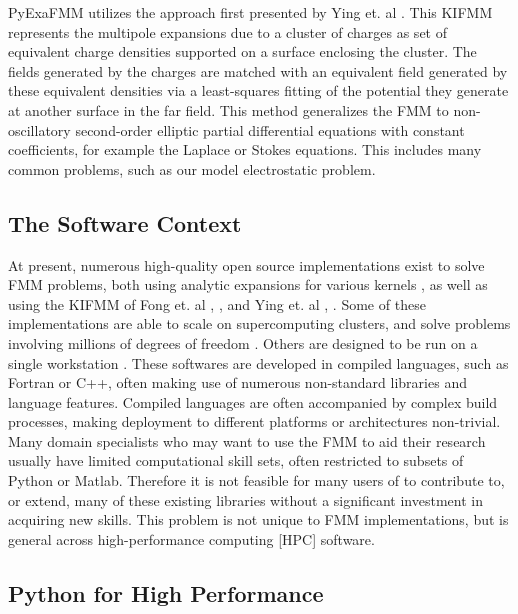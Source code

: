 \documentclass{IEEEcsmag}
\begin{document}
PyExaFMM utilizes the approach first presented by Ying et. al \cite{Ying2004}. This KIFMM represents the multipole expansions due to a cluster of charges as set of equivalent charge densities supported on a surface enclosing the cluster. The fields generated by the charges are matched with an equivalent field generated by these equivalent densities via a least-squares fitting of the potential they generate at another surface in the far field. This method generalizes the FMM to non-oscillatory second-order elliptic partial differential equations with constant coefficients, for example the Laplace or Stokes equations. This includes many common problems, such as our model electrostatic problem.

\subsection{The Software Context}\label{sec:intro:motivation}

At present, numerous high-quality open source implementations exist to solve FMM problems, both using analytic expansions for various kernels \cite{Gimbutas2010}, as well as using the KIFMM of Fong et. al \cite{Bramas2020}, \cite{Agullo2016}, and Ying et. al \cite{Wang2021}, \cite{Lashuk2012}. Some of these implementations are able to scale on supercomputing clusters, and solve problems involving millions of degrees of freedom \cite{Lashuk2012}. Others are designed to be run on a single workstation \cite{Bramas2020, Wang2021}. These softwares are developed in compiled languages, such as Fortran or C++, often making use of numerous non-standard libraries and language features. Compiled languages are often accompanied by complex build processes, making deployment to different platforms or architectures non-trivial. Many domain specialists who may want to use the FMM to aid their research usually have limited computational skill sets, often restricted to subsets of Python or Matlab. Therefore it is not feasible for many users of to contribute to, or extend, many of these existing libraries without a significant investment in acquiring new skills. This problem is not unique to FMM implementations, but is general across high-performance computing [HPC] software.

\subsection{Python for High Performance}
\end{document}
